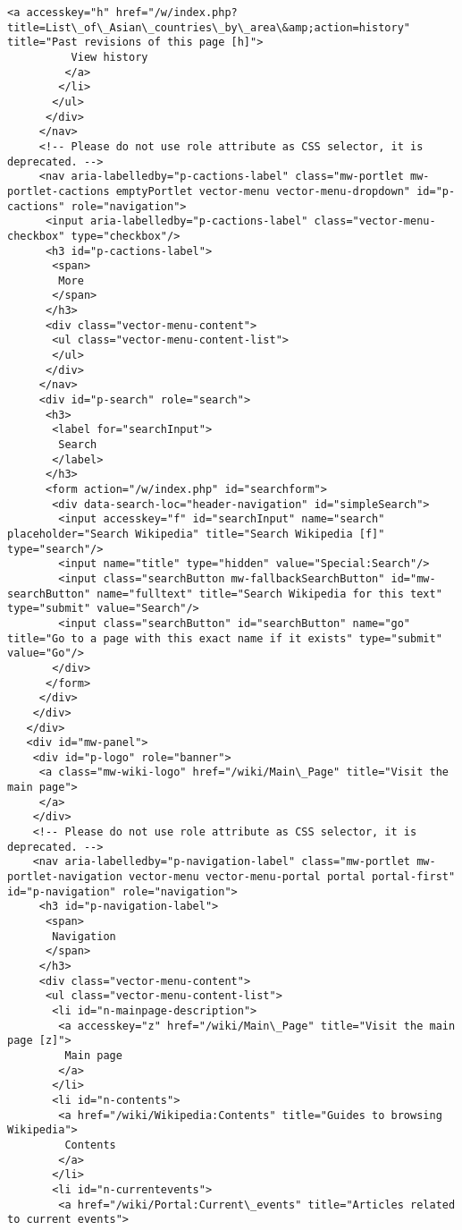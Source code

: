 \documentclass[11pt]{article}
\begin{document}
\begin{Verbatim}[commandchars=\\\{\}]
         <a accesskey="h" href="/w/index.php?title=List\_of\_Asian\_countries\_by\_area\&amp;action=history" title="Past revisions of this page [h]">
          View history
         </a>
        </li>
       </ul>
      </div>
     </nav>
     <!-- Please do not use role attribute as CSS selector, it is deprecated. -->
     <nav aria-labelledby="p-cactions-label" class="mw-portlet mw-portlet-cactions emptyPortlet vector-menu vector-menu-dropdown" id="p-cactions" role="navigation">
      <input aria-labelledby="p-cactions-label" class="vector-menu-checkbox" type="checkbox"/>
      <h3 id="p-cactions-label">
       <span>
        More
       </span>
      </h3>
      <div class="vector-menu-content">
       <ul class="vector-menu-content-list">
       </ul>
      </div>
     </nav>
     <div id="p-search" role="search">
      <h3>
       <label for="searchInput">
        Search
       </label>
      </h3>
      <form action="/w/index.php" id="searchform">
       <div data-search-loc="header-navigation" id="simpleSearch">
        <input accesskey="f" id="searchInput" name="search" placeholder="Search Wikipedia" title="Search Wikipedia [f]" type="search"/>
        <input name="title" type="hidden" value="Special:Search"/>
        <input class="searchButton mw-fallbackSearchButton" id="mw-searchButton" name="fulltext" title="Search Wikipedia for this text" type="submit" value="Search"/>
        <input class="searchButton" id="searchButton" name="go" title="Go to a page with this exact name if it exists" type="submit" value="Go"/>
       </div>
      </form>
     </div>
    </div>
   </div>
   <div id="mw-panel">
    <div id="p-logo" role="banner">
     <a class="mw-wiki-logo" href="/wiki/Main\_Page" title="Visit the main page">
     </a>
    </div>
    <!-- Please do not use role attribute as CSS selector, it is deprecated. -->
    <nav aria-labelledby="p-navigation-label" class="mw-portlet mw-portlet-navigation vector-menu vector-menu-portal portal portal-first" id="p-navigation" role="navigation">
     <h3 id="p-navigation-label">
      <span>
       Navigation
      </span>
     </h3>
     <div class="vector-menu-content">
      <ul class="vector-menu-content-list">
       <li id="n-mainpage-description">
        <a accesskey="z" href="/wiki/Main\_Page" title="Visit the main page [z]">
         Main page
        </a>
       </li>
       <li id="n-contents">
        <a href="/wiki/Wikipedia:Contents" title="Guides to browsing Wikipedia">
         Contents
        </a>
       </li>
       <li id="n-currentevents">
        <a href="/wiki/Portal:Current\_events" title="Articles related to current events">

\end{Verbatim}
\end{document}

